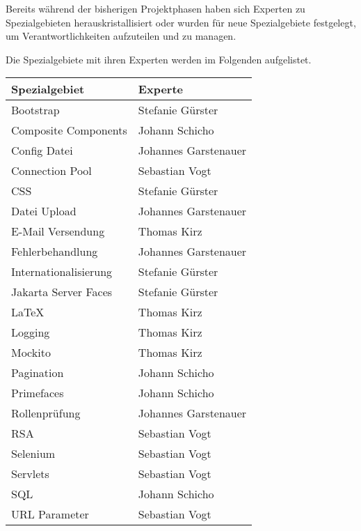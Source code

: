 
Bereits während der bisherigen Projektphasen haben sich Experten zu
Spezialgebieten herauskristallisiert oder wurden für neue Spezialgebiete
festgelegt, um Verantwortlichkeiten aufzuteilen und zu managen.

Die Spezialgebiete mit ihren Experten werden im Folgenden aufgelistet.

\begin{table}[h]
	\centering
	\begin{tabular}{|l|l|}
	\hline
	\textbf{Spezialgebiet} & \textbf{Experte} \\\hline
	\hline
	Bootstrap & Stefanie Gürster \\\hline
	Composite Components & Johann Schicho \\\hline
	Config Datei & Johannes Garstenauer \\\hline
	Connection Pool & Sebastian Vogt \\\hline
	CSS & Stefanie Gürster \\\hline
	Datei Upload & Johannes Garstenauer \\\hline
	E-Mail Versendung & Thomas Kirz \\\hline
	Fehlerbehandlung & Johannes Garstenauer \\\hline
	Internationalisierung & Stefanie Gürster \\\hline
	Jakarta Server Faces & Stefanie Gürster \\\hline
	\LaTeX & Thomas Kirz \\\hline
	Logging & Thomas Kirz \\\hline
	Mockito & Thomas Kirz \\\hline
	Pagination & Johann Schicho \\\hline
	Primefaces & Johann Schicho \\\hline
	Rollenprüfung & Johannes Garstenauer \\\hline
	RSA & Sebastian Vogt \\\hline
	Selenium & Sebastian Vogt \\\hline
	Servlets & Sebastian Vogt \\\hline
	SQL & Johann Schicho \\\hline
	URL Parameter & Sebastian Vogt \\\hline
\end{tabular}
\end{table}